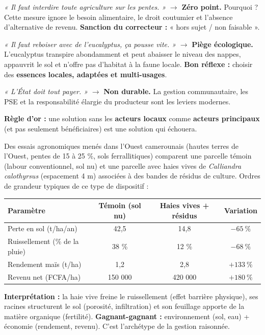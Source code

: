\documentclass[11pt]{article}
\newcommand{\cle}[1]{{\popxbold\color{popdark}#1}}
\begin{document}
\begin{attention}
\emph{« Il faut interdire toute agriculture sur les pentes. »} $\rightarrow$ \textbf{Zéro point.} Pourquoi ? Cette mesure ignore le besoin alimentaire, le droit coutumier et l'absence d'alternative de revenu. \textbf{Sanction du correcteur :} « hors sujet / non faisable ».

\emph{« Il faut reboiser avec de l'eucalyptus, ça pousse vite. »} $\rightarrow$ \textbf{Piège écologique.} L'eucalyptus transpire abondamment et peut abaisser le niveau des nappes, appauvrit le sol et n'offre pas d'habitat à la faune locale. \textbf{Bon réflexe :} choisir des \textbf{essences locales, adaptées et multi-usages}.

\emph{« L'État doit tout payer. »} $\rightarrow$ \textbf{Non durable.} La gestion communautaire, les PSE et la responsabilité élargie du producteur sont les leviers modernes.

\textbf{Règle d'or :} une solution sans les \textbf{acteurs locaux} comme \textbf{acteurs principaux} (et pas seulement bénéficiaires) est une solution qui échouera.
\end{attention}

\begin{exemplebox}
Des essais agronomiques menés dans l'Ouest camerounais (hautes terres de l'Ouest, pentes de 15 à 25 \%, sols ferrallitiques) comparent une parcelle témoin (labour conventionnel, sol nu) et une parcelle avec haies vives de \emph{Calliandra calothyrsus} (espacement 4 m) associées à des bandes de résidus de culture. Ordres de grandeur typiques de ce type de dispositif :
\begin{center}
\begin{tabular}{|l|c|c|c|}\hline
\rowcolor{popblueL}\textbf{Paramètre} & \textbf{Témoin (sol nu)} & \textbf{Haies vives + résidus} & \textbf{Variation} \\ \hline
Perte en sol (t/ha/an) & 42,5 & 14,8 & $-65\ \%$ \\ \hline
Ruissellement (\% de la pluie) & 38 \% & 12 \% & $-68\ \%$ \\ \hline
Rendement maïs (t/ha) & 1,2 & 2,8 & $+133\ \%$ \\ \hline
Revenu net (FCFA/ha) & 150 000 & 420 000 & $+180\ \%$ \\ \hline
\end{tabular}
\end{center}
\textbf{Interprétation :} la haie vive freine le ruissellement (effet barrière physique), ses racines structurent le sol (porosité, infiltration) et son feuillage apporte de la matière organique (fertilité). \textbf{Gagnant-gagnant :} environnement (sol, eau) + économie (rendement, revenu). C'est l'archétype de la \cle{gestion raisonnée}.
\end{exemplebox}
\end{document}
